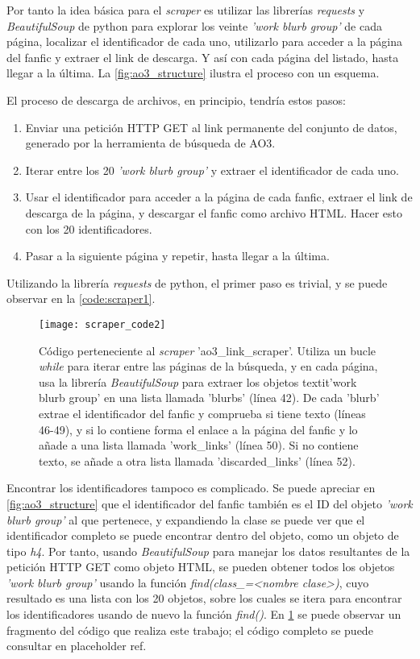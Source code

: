 \documentclass{pre-tfg}
\newcommand{\refToLinkScraperCode}{placeholder ref}
\begin{document}
Por tanto la idea básica para el \textit{scraper} es utilizar las librerías \textit{requests} y \textit{BeautifulSoup} de python para explorar los veinte \textit{'work blurb group'} de cada página, localizar el identificador de cada uno, utilizarlo para acceder a la página del fanfic y extraer el link de descarga. Y así con cada página del listado, hasta llegar a la última. La \ref{fig:ao3_structure} ilustra el proceso con un esquema.

El proceso de descarga de archivos, en principio, tendría estos pasos:

\begin{enumerate}
	\item Enviar una petición HTTP GET al link permanente del conjunto de datos, generado por la herramienta de búsqueda de AO3.
	\item Iterar entre los 20 \textit{'work blurb group'} y extraer el identificador de cada uno.
	\item Usar el identificador para acceder a la página de cada fanfic, extraer el link de descarga de la página, y descargar el fanfic como archivo HTML. Hacer esto con los 20 identificadores.
	\item Pasar a la siguiente página y repetir, hasta llegar a la última.
\end{enumerate}

Utilizando la librería \textit{requests} de python, el primer paso es trivial, y se puede observar en la \ref{code:scraper1}.

\begin{figure}
	\label{code:scraper2}
	\texttt{[image: scraper\_code2]}
	\caption{Código perteneciente al \textit{scraper} 'ao3\_link\_scraper'. Utiliza un bucle \textit{while} para iterar entre las páginas de la búsqueda, y en cada página, usa la librería \textit{BeautifulSoup} para extraer los objetos textit{'work blurb group'} en una lista llamada 'blurbs' (línea 42). De cada 'blurb' extrae el identificador del fanfic y comprueba si tiene texto (líneas 46-49), y si lo contiene forma el enlace a la página del fanfic y lo añade a una lista llamada 'work\_links' (línea 50). Si no contiene texto, se añade a otra lista llamada 'discarded\_links' (línea 52).}
\end{figure}

Encontrar los identificadores tampoco es complicado. Se puede apreciar en \ref{fig:ao3_structure} que el identificador del fanfic también es el ID del objeto \textit{'work blurb group'} al que pertenece, y expandiendo la clase se puede ver que el identificador completo se puede encontrar dentro del objeto, como un objeto de tipo \textit{h4}. Por tanto, usando \textit{BeautifulSoup} para manejar los datos resultantes de la petición HTTP GET como objeto HTML, se pueden obtener todos los objetos \textit{'work blurb group'} usando la función \textit{find(class\_=<nombre clase>)}, cuyo resultado es una lista con los 20 objetos, sobre los cuales se itera para encontrar los identificadores usando de nuevo la función \textit{find()}. En \ref{code:scraper2} se puede observar un fragmento del código que realiza este trabajo; el código completo se puede consultar en \refToLinkScraperCode.
\end{document}
